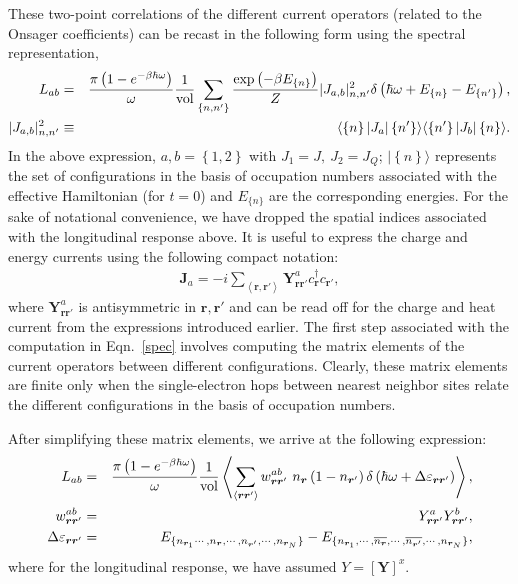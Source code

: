 \documentclass[aps,prx,onecolumn,amsmath,nofootinbib,amssymb,11pt]{revtex4-1}
\renewcommand{\vec}[1]{\boldsymbol{#1}}
\def \ve {\varepsilon}
\def \r {{\vec r}}
\def \ve {\varepsilon}
\def \beq {\begin{eqnarray}}
\def \eeq {\end{eqnarray}}
\def \tn {\textnormal}
\begin{document}
{\begin{appendix}
These two-point correlations of the different current operators (related to the Onsager coefficients) can be recast in the following form using the spectral representation,
\beq
L_{ab} &=& \frac{\pi\left(1-e^{-\beta\hbar\omega}\right)}{\omega}\frac{1}{\tn{vol}}\sum_{\left\{ n,n^{\prime}\right\} }\frac{\exp\left(-\beta E_{\{n\}}\right)}{Z} |J_{a,b}|^2_{n,n'} \delta\left(\hbar\omega+E_{\left\{ n\right\} }-E_{\left\{ n^{\prime}\right\} }\right), \label{spec}\\
|J_{a,b}|^2_{n,n'} &\equiv& \langle\left\{ n\right\} |J_a|\left\{ n^{\prime}\right\} \rangle\langle\left\{ n^{\prime}\right\} |J_b|\left\{ n\right\}\rangle.
\eeq
In the above expression, $a,b=\left\{ 1,2\right\}$ with $J_{1}=J,~J_{2}=J_{Q}$; $|\left\{ n\right\} \rangle$ represents the set of configurations in the basis of occupation numbers associated with the effective Hamiltonian (for $t=0$) and $E_{\{n\}}$
are the corresponding energies. For the sake of notational convenience, we have dropped the spatial indices associated with the longitudinal response above. It is useful to express the charge and energy currents using the following compact notation:
\beq
\bm{J}_{a}=-i\sum_{\left\langle \r,\r'\right\rangle }\bm{Y}_{\r\r'}^{a}c_{\r}^{\dagger}c_{\r'},
\eeq
where $\bm{Y}_{\r\r'}^{a}$ is antisymmetric in $\r,\r'$ and can be read off for the charge and heat current from the expressions introduced earlier. The first step associated with the computation in Eqn.~\ref{spec} involves computing the matrix elements of the current operators between different configurations. Clearly, these matrix elements are finite only when the single-electron hops between nearest neighbor sites relate the different configurations in the basis of occupation numbers.

After simplifying these matrix elements, we arrive at the following expression:
\beq
L_{ab} 
  &=&\frac{\pi \left(1-e^{-\beta\hbar\omega}\right)}{\omega}\frac{1}{\textnormal{vol}}\left\langle \sum_{\left\langle \r\r'\right\rangle } w^{ab}_{\r\r'}~ n_{\r}\left(1-n_{\r'}\right)\delta\left(\hbar\omega+\Delta \ve_{\r\r'}\right)\right\rangle,\\
  w^{ab}_{\r\r'}&=& Y_{\r\r'}^a Y_{\r\r'}^b,\\
  \Delta \ve_{\r\r'}&=& E_{\{n_{\r_{1}}\cdots,n_{\r},\cdots,n_{\r'},\cdots, n_{\r_{N}}\}}-E_{\{n_{\r_{1}},\cdots,\overline{n_{\r}},\cdots,\overline{n_{\r'}},\cdots,n_{\r_{N}}\}},
\eeq
where for the longitudinal response, we have assumed $Y = [\bm{Y}]^x$. 


\end{appendix}}
\end{document}
